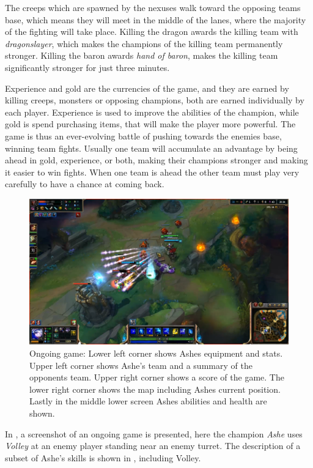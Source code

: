 The creeps which are spawned by the nexuses walk toward the opposing teams base, which means they will meet in the middle of the lanes, where the majority of the fighting will take place. Killing the dragon awards the killing team with \emph{dragonslayer}, which makes the champions of the killing team permanently stronger. Killing the baron awards \emph{hand of baron}, makes the killing team significantly stronger for just three minutes.

Experience and gold are the currencies of the game, and they are earned by killing creeps, monsters or opposing champions, both are earned individually by each player. Experience is used to improve the abilities of the champion, while gold is spend purchasing items, that will make the player more powerful. The game is thus an ever-evolving battle of pushing towards the enemies base, winning team fights. Usually one team will accumulate an advantage by being ahead in gold, experience, or both, making their champions stronger and making it easier to win fights. When one team is ahead the other team must play very carefully to have a chance at coming back. 

\begin{figure}[!htb]
  \centering
    \includegraphics[width=1\textwidth]{img/lolgame.png}
  \caption{Ongoing game: Lower left corner shows Ashes equipment and stats. Upper left corner shows Ashe's team and a summary of the opponents team. Upper right corner shows a score of the game. The lower right corner shows the map including Ashes current position. Lastly in the middle lower screen Ashes abilities and health are shown.}\label{fig:lolgame}
\end{figure}

In , a screenshot of an ongoing game is presented, here the champion \emph{Ashe} uses \emph{Volley} at an enemy player standing near an enemy turret. The description of a subset of Ashe's skills is shown in , including Volley.

